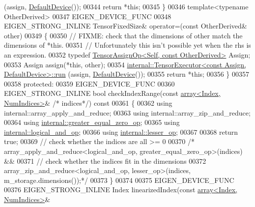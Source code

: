 \begin{DoxyCode}
      (assign, \hyperlink{struct_eigen_1_1_default_device}{DefaultDevice}());
00344       \textcolor{keywordflow}{return} *\textcolor{keyword}{this};
00345     \}
00346     \textcolor{keyword}{template}<\textcolor{keyword}{typename} OtherDerived>
00347     EIGEN\_DEVICE\_FUNC
00348     EIGEN\_STRONG\_INLINE TensorFixedSize& operator=(\textcolor{keyword}{const} OtherDerived& other)
00349     \{
00350       \textcolor{comment}{// FIXME: check that the dimensions of other match the dimensions of *this.}
00351       \textcolor{comment}{// Unfortunately this isn't possible yet when the rhs is an expression.}
00352       \textcolor{keyword}{typedef} \hyperlink{class_eigen_1_1_tensor_assign_op}{TensorAssignOp<Self, const OtherDerived>} Assign;
00353       Assign assign(*\textcolor{keyword}{this}, other);
00354       \hyperlink{class_eigen_1_1internal_1_1_tensor_executor}{internal::TensorExecutor<const Assign, DefaultDevice>::run}
      (assign, \hyperlink{struct_eigen_1_1_default_device}{DefaultDevice}());
00355       \textcolor{keywordflow}{return} *\textcolor{keyword}{this};
00356     \}
00357 
00358   \textcolor{keyword}{protected}:
00359     EIGEN\_DEVICE\_FUNC
00360     EIGEN\_STRONG\_INLINE \textcolor{keywordtype}{bool} checkIndexRange(\textcolor{keyword}{const} \hyperlink{class_eigen_1_1array}{array<Index, NumIndices>}& \textcolor{comment}{/*
      indices*/})\textcolor{keyword}{ const}
00361 \textcolor{keyword}{    }\{
00362       \textcolor{keyword}{using} internal::array\_apply\_and\_reduce;
00363       \textcolor{keyword}{using} internal::array\_zip\_and\_reduce;
00364       \textcolor{keyword}{using} \hyperlink{struct_eigen_1_1internal_1_1greater__equal__zero__op}{internal::greater\_equal\_zero\_op};
00365       \textcolor{keyword}{using} \hyperlink{struct_eigen_1_1internal_1_1logical__and__op}{internal::logical\_and\_op};
00366       \textcolor{keyword}{using} \hyperlink{struct_eigen_1_1internal_1_1lesser__op}{internal::lesser\_op};
00367 
00368       \textcolor{keywordflow}{return} \textcolor{keyword}{true};
00369         \textcolor{comment}{// check whether the indices are all >= 0}
00370           \textcolor{comment}{/*       array\_apply\_and\_reduce<logical\_and\_op, greater\_equal\_zero\_op>(indices) &&}
00371 \textcolor{comment}{        // check whether the indices fit in the dimensions}
00372 \textcolor{comment}{        array\_zip\_and\_reduce<logical\_and\_op, lesser\_op>(indices, m\_storage.dimensions());*/}
00373     \}
00374 
00375     EIGEN\_DEVICE\_FUNC
00376     EIGEN\_STRONG\_INLINE Index linearizedIndex(\textcolor{keyword}{const} \hyperlink{class_eigen_1_1array}{array<Index, NumIndices>}& 

\end{DoxyCode}
